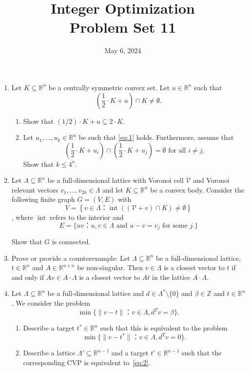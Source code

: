 \documentclass[11pt,a4paper]{article}
\title{Integer Optimization  \\ Problem Set 11 }
\date{ May 6, 2024}
\DeclareMathOperator{\interior}{int}
\begin{document}
\maketitle 


\begin{enumerate}

\item Let $K ⊆ ℝ^n$ be a centrally symmetric convex set. Let $u ∈ ℝ^n$ such that
  \begin{equation}
    \label{eq:1}    
    \left( \frac{1}{2} ⋅ K  + u \right) ∩ K ≠ ∅.
  \end{equation}
  \begin{enumerate}
  \item Show that $(1/2) ⋅ K  + u ⊆ 2 ⋅K$.
  \item Let $u_1,\dots,u_k ∈ ℝ^n$ be such that \eqref{eq:1} holds. Furthermore, assume that
    \begin{displaymath}
       \left(\frac{1}{2} ⋅ K  + u_i  \right)∩ \left(\frac{1}{2} ⋅ K  + u_j \right)  = ∅ \text{ for all } i≠j.
         \end{displaymath}
Show that $k ≤ 4^n$.          
\end{enumerate}

\item Let $Λ⊆ℝ^n$ be a full-dimensional lattice with Voronoi cell $\mathcal{V}$ and Voronoi relevant vectors $v_1,\dots,v_{2k} ∈ Λ$ and let $K ⊆ ℝ^n$ be a convex body. Consider the following finite graph $G = (V,E)$ with
  \begin{displaymath}
    V = \left\{ v ∈ Λ ： \interior \left((\mathcal{V} + v ) ∩ K \right) ≠ ∅  \right\}
  \end{displaymath}, where $\interior$ refers to the interior 
  and
  \begin{displaymath}
    E = \{ uv ： u,v ∈ Λ \text{ and } u-v = v_j \text{ for some } j.  \} 
  \end{displaymath}

  Show that $G$ is connected.
\item Prove or provide a counterexample: Let $Λ ⊆ ℝ^n$ be a full-dimensional lattice,  $t ∈ ℝ^n$ and $A ∈ ℝ^{ n×n}$ be non-singular. Then $v ∈ Λ$ is a closest vector to $t$ if and only if $A v ∈ A⋅Λ$ is a closest vector to $At$ in the lattice $A ⋅Λ$. 
  
\item Let $Λ ⊆ ℝ^n$ be a full-dimensional lattice and $d ∈ Λ^* \setminus \{0\}$ and $β ∈ ℤ$ and $t ∈ ℝ^n$. We consider the problem
  \begin{equation}
    \label{eq:2}
    \min \{ \| v -t \|： v  ∈ Λ, d^T v = β\}. 
  \end{equation}
  \begin{enumerate}
  \item   Describe a target $t^*∈ ℝ^n$  such that this is equivalent to the problem
    \begin{displaymath}
      \min \{ \| v -t^* \|： v  ∈ Λ, d^T v = 0\}.
    \end{displaymath}
  \item Describe a lattice $Λ' ⊆ ℝ^{n-1}$ and a target $t' ∈ ℝ^{n-1}$ such that the corresponding CVP is equivalent to~\eqref{eq:2}. 
  \end{enumerate}


\end{enumerate}
\end{document}
